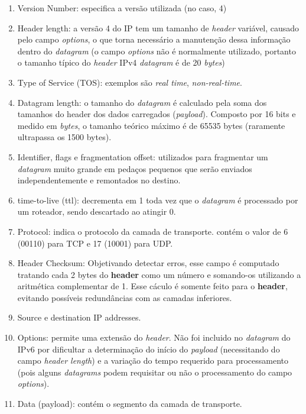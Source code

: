 \begin{enumerate}
\def\labelenumi{\arabic{enumi}.}

\item
  Version Number: especifica a versão utilizada (no caso, 4)
\item
  Header length: a versão 4 do IP tem um tamanho de \emph{header}
  variável, causado pelo campo \emph{options}, o que torna necessário a
  manutenção dessa informação dentro do \emph{datagram} (o campo
  \emph{options} não é normalmente utilizado, portanto o tamanho típico
  do \emph{header} IPv4 \emph{datagram} é de 20 \emph{bytes})
\item
  Type of Service (TOS): exemplos são \emph{real time},
  \emph{non-real-time}.
\item
  Datagram length: o tamanho do \emph{datagram} é calculado pela soma
  dos tamanhos do header dos dados carregados (\emph{payload}). Composto
  por 16 bits e medido em \emph{bytes}, o tamanho teórico máximo é de
  65535 bytes (raramente ultrapassa os 1500 bytes).
\item
  Identifier, flags e fragmentation offset: utilizados para fragmentar
  um \emph{datagram} muito grande em pedaços pequenos que serão enviados
  independentemente e remontados no destino.
\item
  time-to-live (ttl): decrementa em 1 toda vez que o \emph{datagram} é
  processado por um roteador, sendo descartado ao atingir 0.
\item
  Protocol: indica o protocolo da camada de transporte. contém o valor
  de 6 (00110) para TCP e 17 (10001) para UDP.
\item
  Header Checksum: Objetivando detectar erros, esse campo é computado
  tratando cada 2 bytes do \textbf{header} como um número e somando-os
  utilizando a aritmética complementar de 1. Esse cáculo é somente feito
  para o \textbf{header}, evitando possíveis redundâncias com as camadas
  inferiores.
\item
  Source e destination IP addresses.
\item
  Options: permite uma extensão do \emph{header}. Não foi incluido no
  \emph{datagram} do IPv6 por dificultar a determinação do início do
  \emph{payload} (necessitando do campo \emph{header length}) e a
  variação do tempo requerido para processamento (pois alguns
  \emph{datagrams} podem requisitar ou não o processamento do campo
  \emph{options}).
\item
  Data (payload): contém o segmento da camada de transporte.
\end{enumerate}



